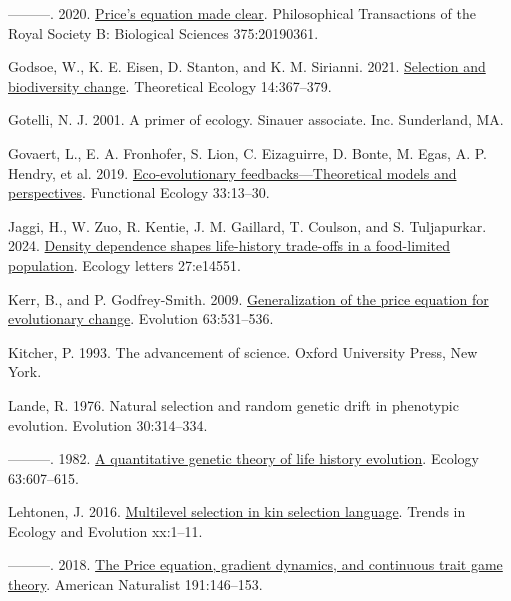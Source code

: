 \documentclass[
]{article}
\newlength{\cslhangindent}
\newenvironment{CSLReferences}[2] %
 {\begin{list}{}{%
  \setlength{\itemindent}{0pt}
  \setlength{\leftmargin}{0pt}
  \setlength{\parsep}{0pt}
  \ifodd #1
   \setlength{\leftmargin}{\cslhangindent}
   \setlength{\itemindent}{-1\cslhangindent}
  \fi
  \setlength{\itemsep}{#2\baselineskip}}}
 {\end{list}}
\begin{document}
\begin{CSLReferences}{0}{0}
---------. 2020. \href{https://doi.org/10.1098/rstb.2019.0361}{{Price's
equation made clear}}. Philosophical Transactions of the Royal Society
B: Biological Sciences 375:20190361.

Godsoe, W., K. E. Eisen, D. Stanton, and K. M. Sirianni. 2021.
\href{https://doi.org/10.1007/s12080-020-00478-3}{Selection and
biodiversity change}. Theoretical Ecology 14:367--379.

Gotelli, N. J. 2001. A primer of ecology. Sinauer associate. Inc.
Sunderland, MA.

Govaert, L., E. A. Fronhofer, S. Lion, C. Eizaguirre, D. Bonte, M. Egas,
A. P. Hendry, et al. 2019.
\href{https://doi.org/10.1111/1365-2435.13241}{{Eco-evolutionary
feedbacks---Theoretical models and perspectives}}. Functional Ecology
33:13--30.

Jaggi, H., W. Zuo, R. Kentie, J. M. Gaillard, T. Coulson, and S.
Tuljapurkar. 2024. \href{https://doi.org/10.1111/ele.14551}{Density
dependence shapes life-history trade-offs in a food-limited population}.
Ecology letters 27:e14551.

Kerr, B., and P. Godfrey-Smith. 2009.
\href{https://doi.org/10.1111/j.1558-5646.2008.00570.x}{{Generalization
of the price equation for evolutionary change}}. Evolution 63:531--536.

Kitcher, P. 1993. {The advancement of science}. Oxford University Press,
New York.

Lande, R. 1976. Natural selection and random genetic drift in phenotypic
evolution. Evolution 30:314--334.

---------. 1982. \href{https://doi.org/10.2307/1936778}{{A quantitative
genetic theory of life history evolution}}. Ecology 63:607--615.

Lehtonen, J. 2016.
\href{https://doi.org/10.1016/j.tree.2016.07.006}{{Multilevel selection
in kin selection language}}. Trends in Ecology and Evolution xx:1--11.

---------. 2018. \href{https://doi.org/10.1086/694891}{{The Price
equation, gradient dynamics, and continuous trait game theory}}.
American Naturalist 191:146--153.


\end{CSLReferences}
\end{document}

